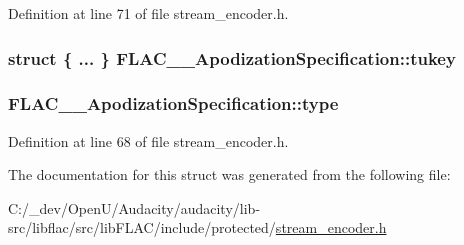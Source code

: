 Definition at line 71 of file stream\+\_\+encoder.\+h.

\subsubsection[{\texorpdfstring{tukey}{tukey}}]{\setlength{\rightskip}{0pt plus 5cm}struct \{ ... \}   F\+L\+A\+C\+\_\+\+\_\+\+Apodization\+Specification\+::tukey}\hypertarget{struct_f_l_a_c_____apodization_specification_aeda477a71be430a5b952a1284c061cd4}{}\label{struct_f_l_a_c_____apodization_specification_aeda477a71be430a5b952a1284c061cd4}
\subsubsection[{\texorpdfstring{type}{type}}]{ F\+L\+A\+C\+\_\+\+\_\+\+Apodization\+Specification\+::type}\hypertarget{struct_f_l_a_c_____apodization_specification_aa463dc878b0d32d81a7d8ce61e3f3aa0}{}\label{struct_f_l_a_c_____apodization_specification_aa463dc878b0d32d81a7d8ce61e3f3aa0}


Definition at line 68 of file stream\+\_\+encoder.\+h.



The documentation for this struct was generated from the following file\+:\begin{DoxyCompactItemize}
\item 
C\+:/\+\_\+dev/\+Open\+U/\+Audacity/audacity/lib-\/src/libflac/src/lib\+F\+L\+A\+C/include/protected/\hyperlink{src_2lib_f_l_a_c_2include_2protected_2stream__encoder_8h}{stream\+\_\+encoder.\+h}\end{DoxyCompactItemize}
